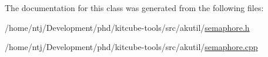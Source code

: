 The documentation for this class was generated from the following files\-:\begin{DoxyCompactItemize}
\item 
/home/ntj/\-Development/phd/kitcube-\/tools/src/akutil/\hyperlink{semaphore_8h}{semaphore.\-h}\item 
/home/ntj/\-Development/phd/kitcube-\/tools/src/akutil/\hyperlink{semaphore_8cpp}{semaphore.\-cpp}\end{DoxyCompactItemize}
